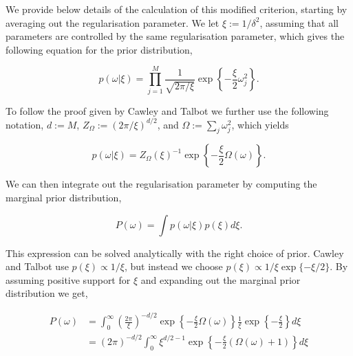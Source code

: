 \documentclass[11pt, oneside]{article}
\begin{document}
We provide below details of the calculation of this modified criterion, starting by averaging out the regularisation parameter.
We let $\xi := 1/\delta^2$, assuming that all parameters are controlled by the same regularisation parameter, which gives the following equation for the prior distribution,

\vspace{-0.5cm}
\begin{equation}
    p(\omega | \xi) = \prod_{j=1}^{M} \frac{1}{\sqrt{2\pi/\xi}}  \exp \left\{ -\frac{\xi}{2} \omega_j^2 \right\}.
\end{equation}

To follow the proof given by Cawley and Talbot we further use the following notation, $d := M$, $Z_\Omega := \left( 2\pi / \xi \right)^{d/2}$, and $\Omega := \sum_j \omega_j^2$, which yields

\vspace{-0.5cm}
\begin{equation}
    p(\omega | \xi) = {Z_\Omega(\xi)}^{-1}  \exp \left\{ -\frac{\xi}{2} \Omega(\omega)\right\}.
\end{equation}

We can then integrate out the regularisation parameter by computing the marginal prior distribution,

\vspace{-0.5cm}
\begin{equation}
    P(\omega) = \int p(\omega | \xi) p(\xi) d\xi.
\end{equation}

This expression can be solved analytically with the right choice of prior. 
Cawley and Talbot use $p(\xi) \propto 1/\xi$, but instead we choose $p(\xi) \propto 1/\xi \exp\{-\xi/2\}$.
By assuming positive support for $\xi$ and expanding out the marginal prior distribution we get,

\vspace{-0.5cm}
\begin{equation}
\begin{aligned}
    P(\omega) &= \int_0^{\infty} \left( \frac{2\pi}{\xi} \right)^{-d/2}  \exp \left\{ -\frac{\xi}{2} \Omega(\omega)\right\} \frac{1}{\xi} \exp\left\{-\frac{\xi}{2}\right\} d\xi\\
    &= (2\pi)^{-d/2} \int_0^{\infty} \xi^{d/2-1} \exp \left\{ -\frac{\xi}{2} \left(\Omega(\omega) + 1 \right) \right\} d\xi \\
\end{aligned}
\end{equation}
\end{document}
